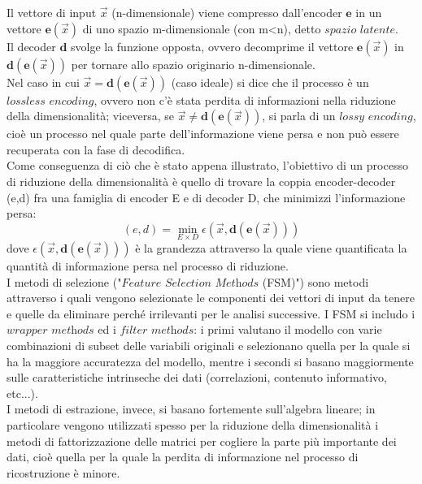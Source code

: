 Il vettore di input $\vec{x}$ (n-dimensionale) viene compresso dall'encoder $\textbf{e}$ in un vettore $\textbf{e}(\vec{x})$ di uno spazio m-dimensionale (con m<n), detto $\textit{spazio latente}$. \\
Il decoder $\textbf{d}$ svolge la funzione opposta, ovvero decomprime il vettore $\textbf{e}(\vec{x})$ in $\textbf{d}(\textbf{e}(\vec{x}))$ per tornare allo spazio originario n-dimensionale. \\
Nel caso in cui $\vec{x} = \textbf{d}(\textbf{e}(\vec{x}))$ (caso ideale) si dice che il processo è un $\textit{lossless encoding}$, ovvero non c'è stata perdita di informazioni nella riduzione della dimensionalità; viceversa, se $\vec{x} \not= \textbf{d}(\textbf{e}(\vec{x}))$, si parla di un $\textit{lossy encoding}$, cioè un processo nel quale parte dell'informazione viene persa e non può essere recuperata con la fase di decodifica. \\
Come conseguenza di ciò che è stato appena illustrato, l'obiettivo di un processo di riduzione della dimensionalità è quello di trovare la coppia encoder-decoder (e,d) fra una famiglia di encoder E e di decoder D, che minimizzi l'informazione persa:
\begin{equation}
(e,d) = \min_{E \times D} \epsilon (\vec{x},\textbf{d}(\textbf{e}(\vec{x})))
\end{equation}
dove $\epsilon (\vec{x},\textbf{d}(\textbf{e}(\vec{x})))$ è la grandezza attraverso la quale viene  quantificata la quantità di informazione persa nel processo di riduzione. \\
I metodi di selezione ("$\textit{Feature Selection Methods}$ (FSM)") sono metodi attraverso i quali vengono selezionate le componenti dei vettori di input da tenere e quelle da eliminare perché irrilevanti per le analisi successive. I FSM si includo i $\textit{wrapper methods}$ ed i $\textit{filter methods}$: i primi valutano il modello con varie combinazioni di subset delle variabili originali e selezionano quella per la quale si ha la maggiore accuratezza del modello, mentre i secondi si basano maggiormente sulle caratteristiche intrinseche dei dati (correlazioni, contenuto informativo, etc...). \\
I metodi di estrazione, invece, si basano fortemente sull'algebra lineare; in particolare vengono utilizzati spesso per la riduzione della dimensionalità i metodi di fattorizzazione delle matrici per cogliere la parte più importante dei dati, cioè quella per la quale la perdita di informazione nel processo di ricostruzione è minore. \\
